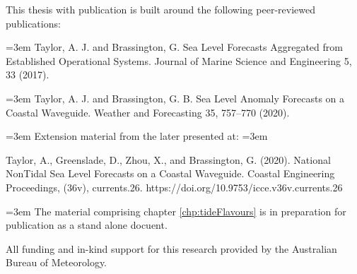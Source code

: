 
\begin{preface}

This thesis with publication is built around the following peer-reviewed publications:

\vspace{5mm}
\hangindent=3em
Taylor, A. J. and Brassington, G. Sea Level Forecasts Aggregated from Established Operational Systems. Journal of Marine Science and Engineering 5, 33 (2017).



\vspace{5mm}
\hangindent=3em
Taylor, A. J. and Brassington, G. B. Sea Level Anomaly Forecasts on a Coastal Waveguide. Weather and Forecasting 35, 757–770 (2020).

\vspace{5mm}
\hangindent=3em
Extension material from the later presented at:
\vspace{5mm}
\hangindent=3em

Taylor, A., Greenslade, D., Zhou, X., and Brassington, G. (2020). National NonTidal Sea Level Forecasts on a Coastal Waveguide. Coastal Engineering Proceedings, (36v), currents.26. https://doi.org/10.9753/icce.v36v.currents.26

\vspace{5mm}
\hangindent=3em
The material comprising chapter \ref{chp:tideFlavours} is in preparation for publication as a stand alone docuent. 

\vspace{5mm}
\noindent  All funding and in-kind support for this research provided by the Australian Bureau of Meteorology. 

\end{preface}


